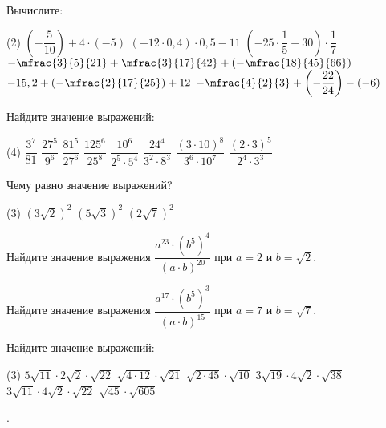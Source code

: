 %
%

\begin{class}[number=1]
	\begin{listofex}
		\item Вычислите:
		\begin{tasks}(2)
			\task \( \left( -\dfrac{ 5 }{ 10 } \right)+4 \cdot (-5) \)
			\task \( (-12 \cdot 0,4) \cdot 0,5 - 11 \)
			\task \( (-25 \cdot \dfrac{ 1 }{ 5 } - 30) \cdot \dfrac{ 1 }{ 7 } \)
			\task \( -\mfrac{3}{5}{21}+\mfrac{3}{17}{42}+\left(-\mfrac{18}{45}{66}\right) \)
			\task \( -15,2 + \left(-\mfrac{2}{17}{25}\right) + 12 \)
			\task \( -\mfrac{4}{2}{3} + \left(-\dfrac{22}{24}\right) - (-6) \)
		\end{tasks}
		\item Найдите значение выражений:
		\begin{tasks}(4)
			\task \( \dfrac{3^7}{81} \)
			\task \( \dfrac{27^5}{9^6} \)
			\task \( \dfrac{81^5}{27^6} \)
			\task \( \dfrac{125^6}{25^8} \)
			\task \( \dfrac{10^6}{2^5\cdot5^4} \)
			\task \( \dfrac{24^4}{3^2\cdot8^3} \)
			\task \( \dfrac{(3\cdot10)^8}{3^6\cdot10^7} \)
			\task \( \dfrac{(2\cdot3)^5}{2^4\cdot3^3} \)
		\end{tasks}
		\item Чему равно значение выражений?
		\begin{tasks}(3)
			\task \( (3\sqrt{2})^2 \)
			\task \( (5\sqrt{3})^2 \)
			\task \( (2\sqrt{7})^2 \)
		\end{tasks}
		\item Найдите значение выражения \( \dfrac{a^{23}\cdot(b^5)^4}{(a\cdot b)^{20}} \) при \( a=2 \) и \( b=\sqrt{2} \).
		\item Найдите значение выражения \( \dfrac{a^{17}\cdot(b^5)^3}{(a\cdot b)^{15}} \) при \( a=7 \) и \( b=\sqrt{7} \).
		\item Найдите значение выражений:
		\begin{tasks}(3)
			\task \( 5\sqrt{11}\cdot2\sqrt{2}\cdot\sqrt{22} \)
			\task \( \sqrt{4\cdot12}\cdot\sqrt{21} \)
			\task \( \sqrt{2\cdot45}\cdot\sqrt{10} \)
			\task \( 3\sqrt{19}\cdot4\sqrt{2}\cdot\sqrt{38} \)
			\task \( 3\sqrt{11}\cdot4\sqrt{2}\cdot\sqrt{22} \)
			\task \( \sqrt{45}\cdot\sqrt{605} \)
		\end{tasks}
	\end{listofex}
\end{class}

\begin{class}[number=2]
	\begin{listofex}
		\item .
	\end{listofex}
\end{class}

